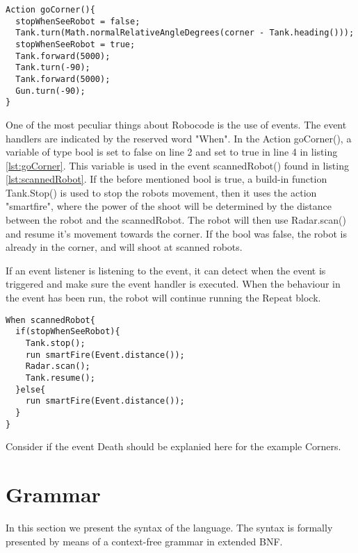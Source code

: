 \begin{lstlisting}[caption={Code listing of the Action goCorner()}, xleftmargin=.2\textwidth, label={lst:goCorner}]
Action goCorner(){
  stopWhenSeeRobot = false;  
  Tank.turn(Math.normalRelativeAngleDegrees(corner - Tank.heading()));      
  stopWhenSeeRobot = true;
  Tank.forward(5000);
  Tank.turn(-90);
  Tank.forward(5000);
  Gun.turn(-90);
}
\end{lstlisting}

One of the most peculiar things about Robocode is the use of events. The event handlers are indicated by the reserved word "When". 
In the Action goCorner(), a variable of type bool is set to false on line 2 and set to true in line 4 in listing \ref{lst:goCorner}. This variable is used in the event scannedRobot() found in listing \ref{lst:scannedRobot}. If the before mentioned bool is true, a build-in function Tank.Stop() is used to stop the robots movement, then it uses the action "smartfire", where the power of the shoot will be determined by the distance between the robot and the scannedRobot. The robot will then use Radar.scan() and resume it's movement towards the corner. If the bool was false, the robot is already in the corner, and will shoot at scanned robots.

If an event listener is listening to the event, it can detect when the event is triggered and make sure the event handler is executed. When the behaviour in the event has been run, the robot will continue running the Repeat block.  


\begin{lstlisting}[caption={Code listing of the event scannedRobot()} label=corners3, xleftmargin=.2\textwidth, label={lst:scannedRobot}]
When scannedRobot{
  if(stopWhenSeeRobot){
    Tank.stop();                                     
    run smartFire(Event.distance());
    Radar.scan();                                     
    Tank.resume();                                   
  }else{
    run smartFire(Event.distance());
  }
}
\end{lstlisting}

Consider if the event Death should be explanied here for the example Corners. 


\section{Grammar}
\label{sec:Grammar}
In this section we present the syntax of the language. The syntax is formally presented by means of a context-free grammar in extended BNF.

